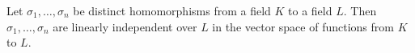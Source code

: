 Let $\sigma_1, \ldots, \sigma_n$ be distinct homomorphisms from a field $K$ to a field $L$. Then $\sigma_1, \ldots, \sigma_n$ are linearly independent over $L$ in the vector space of functions from $K$ to $L$.
